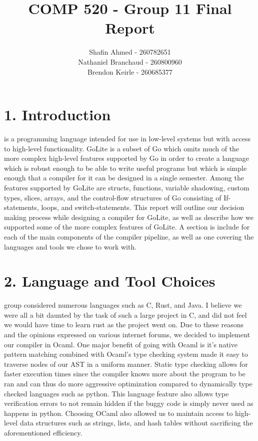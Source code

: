 \documentclass{article}
\begin{document}
\title{COMP 520 - Group 11 Final Report}
\author{Shafin Ahmed - 260782651\\Nathaniel Branchaud - 260800960\\Brendon Keirle - 260685377}
\maketitle

\section*{1. Introduction}\mbox{}
 is a programming language intended for use in low-level systems but with access to high-level functionality.
GoLite is a subset of Go which omits much of the more complex high-level features supported by Go in order to create a language which is robust enough to be able to write useful programs but which is simple enough that a compiler for it can be designed in a single semester.
Among the features supported by GoLite are structs, functions, variable shadowing, custom types, slices, arrays, and the control-flow structures of Go consisting of If-statements, loops, and switch-statements.
This report will outline our decision making process while designing a compiler for GoLite, as well as describe how we supported some of the more complex features of GoLite.
A section is include for each of the main components of the compiler pipeline, as well as one covering the languages and tools we chose to work with. 
\section*{2. Language and Tool Choices}\mbox{}
 group considered numerous languages such as C, Rust, and Java.
I believe we were all a bit daunted by the task of such a large project in C, and did not feel we would have time to learn rust as the project went on.
Due to these reasons and the opinions expressed on various internet forums, we decided to implement our compiler in Ocaml.
One major benefit of going with Ocaml is it's native pattern matching combined with Ocaml's type checking system made it easy to traverse nodes of our AST in a uniform manner.
Static type checking allows for faster execution times since the compiler knows more about the program to be ran and can thus do more aggressive optimization compared to dynamically type checked languages such as python.
This language feature also allows type verification errors to not remain hidden if the buggy code is simply never used as happens in python.
Choosing OCaml also allowed us to maintain access to high-level data structures such as strings, lists, and hash tables without sacrificing the aforementioned efficiency.
\end{document}
